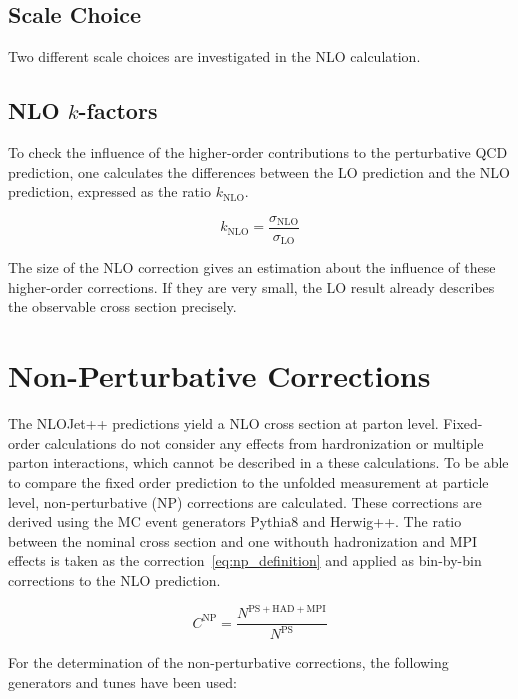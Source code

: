 \subsection{Scale Choice}

Two different scale choices are investigated in the NLO calculation. 

\subsection{NLO $k$-factors}

To check the influence of the higher-order contributions to the perturbative QCD
prediction, one calculates the differences between the LO prediction and the NLO
prediction, expressed as the ratio $k_\mathrm{NLO}$. 

\begin{equation*}
    k_{\mathrm{NLO}} = \frac{\sigma_{\mathrm{NLO}}}{\sigma_{\mathrm{LO}}}
\end{equation*}

The size of the NLO
correction gives an estimation about the influence of these higher-order
corrections. If they are very small, the LO result already describes the
observable cross section precisely.

\section{Non-Perturbative Corrections}

The NLOJet++ predictions yield a NLO cross section at parton level.  Fixed-order
calculations do not consider any effects from hardronization or multiple parton
interactions, which cannot be described in a these calculations. To be able to
compare the fixed order prediction to the unfolded measurement at particle
level, non-perturbative (NP) corrections are calculated. These corrections are
derived using the MC event generators Pythia8 and Herwig++. The ratio between
the nominal cross section and one withouth hadronization and MPI effects is
taken as the correction~\ref{eq:np_definition} and applied as bin-by-bin corrections to the NLO
prediction.

\begin{equation}
    C^{\mathrm{NP}} = \frac{N^{\mathrm{PS+HAD+MPI}}}{N^{\mathrm{PS}}}
    \label{eq:np_definition}
\end{equation}

For the determination of the non-perturbative corrections, the following
generators and tunes have been used:

